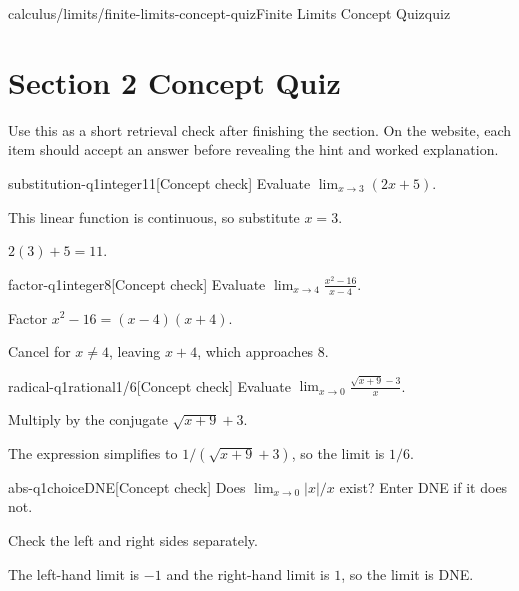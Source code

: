 \begin{webpage}{calculus/limits/finite-limits-concept-quiz}{Finite Limits Concept Quiz}{quiz}
\section*{Section 2 Concept Quiz}

Use this as a short retrieval check after finishing the section. On the website, each item should accept an answer before revealing the hint and worked explanation.

\begin{bgcheck}{substitution-q1}{integer}{11}[Concept check]
Evaluate \(\lim_{x\to3}(2x+5)\).
\begin{bghint}
This linear function is continuous, so substitute \(x=3\).
\end{bghint}
\begin{bgreveal}
\(2(3)+5=11\).
\end{bgreveal}
\end{bgcheck}

\begin{bgcheck}{factor-q1}{integer}{8}[Concept check]
Evaluate \(\lim_{x\to4}\frac{x^2-16}{x-4}\).
\begin{bghint}
Factor \(x^2-16=(x-4)(x+4)\).
\end{bghint}
\begin{bgreveal}
Cancel for \(x\ne4\), leaving \(x+4\), which approaches \(8\).
\end{bgreveal}
\end{bgcheck}

\begin{bgcheck}{radical-q1}{rational}{1/6}[Concept check]
Evaluate \(\lim_{x\to0}\frac{\sqrt{x+9}-3}{x}\).
\begin{bghint}
Multiply by the conjugate \(\sqrt{x+9}+3\).
\end{bghint}
\begin{bgreveal}
The expression simplifies to \(1/(\sqrt{x+9}+3)\), so the limit is \(1/6\).
\end{bgreveal}
\end{bgcheck}

\begin{bgcheck}{abs-q1}{choice}{DNE}[Concept check]
Does \(\lim_{x\to0}|x|/x\) exist? Enter DNE if it does not.
\begin{bghint}
Check the left and right sides separately.
\end{bghint}
\begin{bgreveal}
The left-hand limit is \(-1\) and the right-hand limit is \(1\), so the limit is DNE.
\end{bgreveal}
\end{bgcheck}


\end{webpage}
